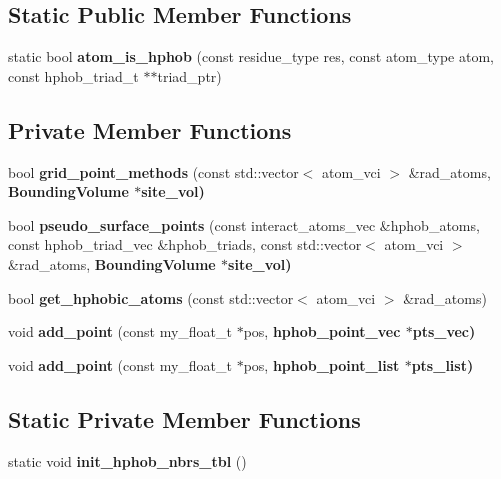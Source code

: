 \subsection*{Static Public Member Functions}
\begin{CompactItemize}
\item 
static bool \textbf{atom\_\-is\_\-hphob} (const residue\_\-type res, const atom\_\-type atom, const hphob\_\-triad\_\-t $\ast$$\ast$triad\_\-ptr)\label{classASCbase_1_1HphobPoints_f0aded6fe4d43082ae2eec98b78e4c8b}

\end{CompactItemize}
\subsection*{Private Member Functions}
\begin{CompactItemize}
\item 
bool \textbf{grid\_\-point\_\-methods} (const std::vector$<$ atom\_\-vci $>$ \&rad\_\-atoms, \bf{Bounding\-Volume} $\ast$site\_\-vol)\label{classASCbase_1_1HphobPoints_e735089461a76a86bda11000aa4ee0e7}

\item 
bool \textbf{pseudo\_\-surface\_\-points} (const interact\_\-atoms\_\-vec \&hphob\_\-atoms, const hphob\_\-triad\_\-vec \&hphob\_\-triads, const std::vector$<$ atom\_\-vci $>$ \&rad\_\-atoms, \bf{Bounding\-Volume} $\ast$site\_\-vol)\label{classASCbase_1_1HphobPoints_6d66bc1b44810ac36026c71f7eebcbeb}

\item 
bool \textbf{get\_\-hphobic\_\-atoms} (const std::vector$<$ atom\_\-vci $>$ \&rad\_\-atoms)\label{classASCbase_1_1HphobPoints_8f92e0433c19f069aef713485e1e60d7}

\item 
void \textbf{add\_\-point} (const my\_\-float\_\-t $\ast$pos, \bf{hphob\_\-point\_\-vec} $\ast$pts\_\-vec)\label{classASCbase_1_1HphobPoints_ce1ced666cfe3a8dd21195605609af1d}

\item 
void \textbf{add\_\-point} (const my\_\-float\_\-t $\ast$pos, \bf{hphob\_\-point\_\-list} $\ast$pts\_\-list)\label{classASCbase_1_1HphobPoints_8b20d2a672fc333c8ea5be0f1edf3bcc}

\end{CompactItemize}
\subsection*{Static Private Member Functions}
\begin{CompactItemize}
\item 
static void \textbf{init\_\-hphob\_\-nbrs\_\-tbl} ()\label{classASCbase_1_1HphobPoints_370c8b40fcd5b0ff04da11eac6697463}

\end{CompactItemize}
